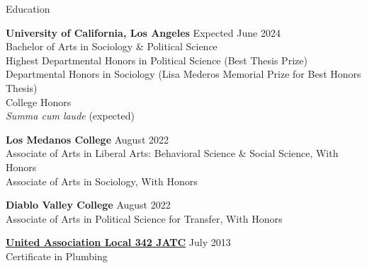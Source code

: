 \documentclass[
	11pt, %
]{resume} %
\begin{document}
\thispagestyle{firstpagestyle}

\begin{samepage}
\begin{rSection}{Education}
	
	\textbf{University of California, Los Angeles} \hfill Expected June 2024 \\
	Bachelor of Arts in Sociology \& Political Science\\
	Highest Departmental Honors in Political Science (Best Thesis Prize)\\
	Departmental Honors in Sociology (Lisa Mederos Memorial Prize for Best Honors Thesis)\\
	College Honors\\
	\textit{Summa cum laude} (expected)

	\textbf{Los Medanos College} \hfill August 2022\\ 
	Associate of Arts in Liberal Arts: Behavioral Science \& Social Science, With Honors\\
	Associate of Arts in Sociology, With Honors

	\textbf{Diablo Valley College} \hfill August 2022\\ 
	Associate of Arts in Political Science for Transfer, With Honors
	
	\href{https://ua342.org/training}{\textbf{United Association Local 342 JATC}} \hfill July 2013\\
	Certificate in Plumbing
\end{rSection}
\end{samepage}
\end{document}
